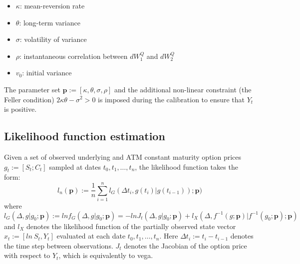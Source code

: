 \documentclass{article}
\newcommand{\be}{\begin{equation}}
\newcommand{\ee}{\end{equation}}
\begin{document}
\begin{itemize}
\item $\kappa$: mean-reversion rate 
\item $\theta$: long-term variance 
\item $\sigma$: volatility of variance 
\item $\rho$: instantaneous correlation between
$dW^Q_1$ and $dW_2^Q$
\item $v_0$: initial variance 
\end{itemize}


The parameter set $\mathbf{p}:=[\kappa, \theta, \sigma, \rho]$ and the additional non-linear constraint (the Feller condition) $2\kappa\theta - \sigma^2>0$ is imposed during the calibration to ensure that $Y_t$ is positive.




\subsection{Likelihood function estimation}
Given a set of observed underlying and ATM constant maturity option prices $g_t:=[S_t; C_t]$ sampled at dates $t_0,t_1,\dots, t_n$, the likelihood function takes the form:
\be
l_n(\mathbf{p}):=\frac{1}{n}\sum_{i=1}^nl_G(\Delta t_i,g(t_i)|g(t_{i-1}));\mathbf{p})
\ee
where
\be
l_G(\Delta, g|g_0;\mathbf{p}) := ln f_G(\Delta,g|g_0;\mathbf{p}) = - ln J_t(\Delta, g|g_0;\mathbf{p}) + l_X(\Delta, f^{-1}(g;\mathbf{p})| f^{-1}(g_0;\mathbf{p});\mathbf{p})
\label{eq:likelihood}
\ee
and $l_X$ denotes the likelihood function of the partially observed state vector $x_t:=[ln~S_t, Y_t]$ evaluated at each date $t_0,t_1,\dots, t_n$. Here $\Delta t_i:=t_i-t_{i-1}$ denotes the time step between observations. $J_t$ denotes the Jacobian of the option price with respect to $Y_t$, which is equivalently to vega.
\end{document}
